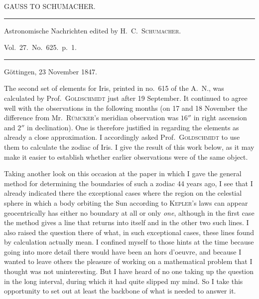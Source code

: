 \clearpage{}%
\begin{center}
{\small GAUSS TO SCHUMACHER.\par}
\medskip\hrule\medskip
{\small Astronomische Nachrichten edited by H.\ C.\ \textsc{Schumacher}.\par
Vol.\ 27.\ No.\ 625.\ p.\ 1.\par}
\medskip\hrule
\end{center}\medskip
\begin{flushright}Göttingen, 23 November 1847.\end{flushright}
The second set of elements for Iris, printed in no.\ 615 of the A.\ N., was calculated by Prof.\ \textsc{Goldschmidt} just after 19 September. It continued to agree well with the observations in the following months (on 17 and 18 November the difference from Mr.\ \textsc{Rümcker}’s meridian observation was $16''$ in right ascension and $2''$ in declination). One is therefore justified in regarding the elements as already a close approximation. I accordingly asked Prof.\ \textsc{Goldschmidt} to use them to calculate the zodiac of Iris. I give the result of this work below, as it may make it easier to establish whether earlier observations were of the same object.

Taking another look on this occasion at the paper in which I gave the general method for determining the boundaries of such a zodiac 44 years ago, I see that I already indicated there the exceptional cases where the region on the celestial sphere in which a body orbiting the Sun according to \textsc{Kepler}’s laws can appear geocentrically has either no boundary at all or only \textit{one}, although in the first case the method gives a line that returns into itself and in the other two such lines. I also raised the question there of what, in such exceptional cases, these lines found by calculation actually
%
mean. I confined myself to those hints at the time because going into more detail there would have been an hors d’oeuvre, and because I wanted to leave others the pleasure of working on a mathematical problem that I thought was not uninteresting. But I have heard of no one taking up the question in the long interval, during which it had quite slipped my mind. So I take this opportunity to set out at least the backbone of what is needed to answer it.

